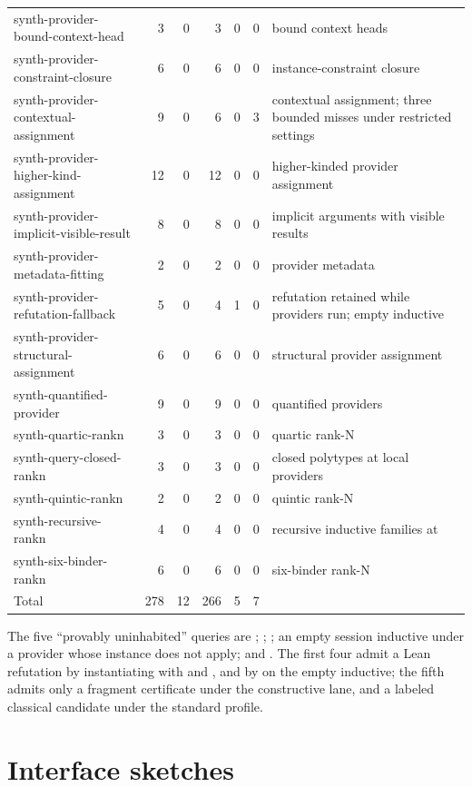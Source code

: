 {\begin{longtable}{@{}L{4.3cm}rrrrrL{4.85cm}@{}}
synth-provider-bound-context-head & 3 & 0 & 3 & 0 & 0 & bound context heads \\
synth-provider-constraint-closure & 6 & 0 & 6 & 0 & 0 & instance-constraint closure \\
synth-provider-contextual-assignment & 9 & 0 & 6 & 0 & 3 & contextual assignment; three bounded misses under restricted settings \\
synth-provider-higher-kind-assignment & 12 & 0 & 12 & 0 & 0 & higher-kinded provider assignment \\
synth-provider-implicit-visible-result & 8 & 0 & 8 & 0 & 0 & implicit arguments with visible results \\
synth-provider-metadata-fitting & 2 & 0 & 2 & 0 & 0 & provider metadata \\
synth-provider-refutation-fallback & 5 & 0 & 4 & 1 & 0 & refutation retained while providers run; empty inductive \\
synth-provider-structural-assignment & 6 & 0 & 6 & 0 & 0 & structural provider assignment \\
synth-quantified-provider & 9 & 0 & 9 & 0 & 0 & quantified providers \\
synth-quartic-rankn & 3 & 0 & 3 & 0 & 0 & quartic rank-N \\
synth-query-closed-rankn & 3 & 0 & 3 & 0 & 0 & closed polytypes at local providers \\
synth-quintic-rankn & 2 & 0 & 2 & 0 & 0 & quintic rank-N \\
synth-recursive-rankn & 4 & 0 & 4 & 0 & 0 & recursive inductive families at  \\
synth-six-binder-rankn & 6 & 0 & 6 & 0 & 0 & six-binder rank-N \\
\midrule
Total & 278 & 12 & 266 & 5 & 7 & \\
\bottomrule
\end{longtable}
}

The five ``provably uninhabited'' queries are ; ; ; an empty session inductive under a provider whose instance does not apply; and . The first four admit a Lean refutation by instantiating with  and , and by  on the empty inductive; the fifth admits only a fragment certificate under the constructive lane, and a labeled classical candidate under the standard profile.

\section{Interface sketches}\label{app:interfaces}

